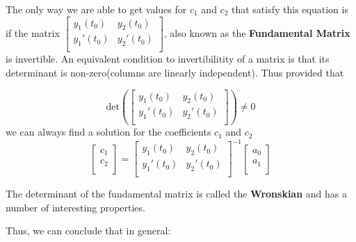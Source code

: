 \documentclass{report}
\begin{document}
The only way we are able to get values for $c_1$ and $c_2$ that satisfy this equation is if the matrix 
$\begin{bmatrix}
    y_1(t_0) & y_2(t_0) \\
    y_1'(t_0) & y_2'(t_0) \\
\end{bmatrix}$,
also known as the \textbf{Fundamental Matrix} is invertible. An equivalent condition to invertibilitity of a matrix is that its determinant is non-zero(columns are linearly independent). Thus provided that

$$\text{det}\left(\begin{bmatrix}
    y_1(t_0) & y_2(t_0) \\
    y_1'(t_0) & y_2'(t_0) \\
\end{bmatrix}\right)
\neq 0
$$
we can always find a solution for the coefficients $c_1$ and $c_2$
$$
\begin{bmatrix}
    c_1 \\
    c_2 \\
\end{bmatrix}
=
\begin{bmatrix}
    y_1(t_0) & y_2(t_0) \\
    y_1'(t_0) & y_2'(t_0) \\
\end{bmatrix}^{-1}
\begin{bmatrix}
    a_0 \\
    a_1 \\
\end{bmatrix}
$$

The determinant of the fundamental matrix is called the \textbf{Wronskian} and has a number of interesting properties. 

Thus, we can conclude that in general:
\end{document}
